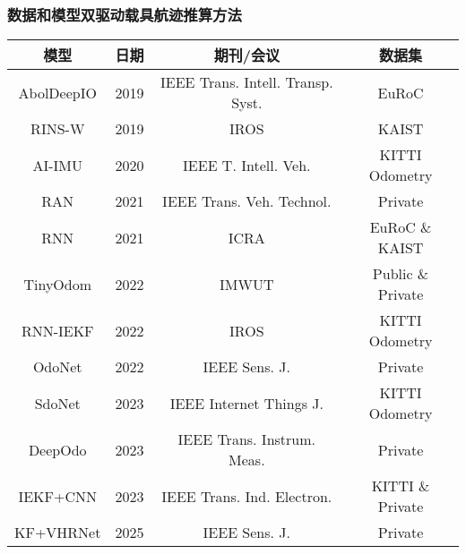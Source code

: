 \begin{frame}

    \frametitle{数据和模型双驱动载具航迹推算方法}
    
    {\small
   		\begin{tabular*}{\linewidth}{@{\extracolsep{\fill}}cccc}
			\toprule
			\multicolumn{1}{c}{模型} & 日期 & 期刊/会议 & 数据集 \\
			\midrule
			AbolDeepIO & 2019 & IEEE Trans. Intell. Transp. Syst. & EuRoC          \\ %
			RINS-W     & 2019 & IROS                              & KAIST          \\ %
			AI-IMU     & 2020 & IEEE T. Intell. Veh.              & KITTI Odometry \\ %
			RAN        & 2021 & IEEE Trans. Veh. Technol.         & Private         \\ %
			RNN        & 2021 & ICRA                              & EuRoC \& KAIST    \\ 
			TinyOdom   & 2022 & IMWUT                             & Public \& Private \\
			RNN-IEKF   & 2022 & IROS                              & KITTI Odometry    \\
			OdoNet     & 2022 & IEEE Sens. J.                     & Private         \\ %
			SdoNet     & 2023 & IEEE Internet Things J.           & KITTI Odometry \\ %
			DeepOdo    & 2023 & IEEE Trans. Instrum. Meas.        & Private         \\ %
			IEKF+CNN   & 2023 & IEEE Trans. Ind. Electron.        & KITTI \& Private         \\ %
			KF+VHRNet  & 2025 & IEEE Sens. J.                     & Private         \\ %
			\bottomrule
   		\end{tabular*}       
   	}

\end{frame}
